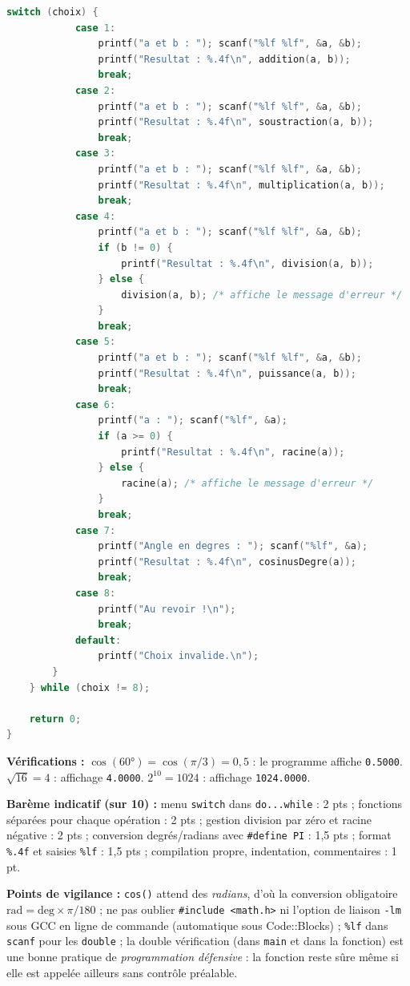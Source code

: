 \documentclass[11pt]{article}
\begin{document}
\begin{corrige}
\begin{lstlisting}[language=C]
        switch (choix) {
            case 1:
                printf("a et b : "); scanf("%lf %lf", &a, &b);
                printf("Resultat : %.4f\n", addition(a, b));
                break;
            case 2:
                printf("a et b : "); scanf("%lf %lf", &a, &b);
                printf("Resultat : %.4f\n", soustraction(a, b));
                break;
            case 3:
                printf("a et b : "); scanf("%lf %lf", &a, &b);
                printf("Resultat : %.4f\n", multiplication(a, b));
                break;
            case 4:
                printf("a et b : "); scanf("%lf %lf", &a, &b);
                if (b != 0) {
                    printf("Resultat : %.4f\n", division(a, b));
                } else {
                    division(a, b); /* affiche le message d'erreur */
                }
                break;
            case 5:
                printf("a et b : "); scanf("%lf %lf", &a, &b);
                printf("Resultat : %.4f\n", puissance(a, b));
                break;
            case 6:
                printf("a : "); scanf("%lf", &a);
                if (a >= 0) {
                    printf("Resultat : %.4f\n", racine(a));
                } else {
                    racine(a); /* affiche le message d'erreur */
                }
                break;
            case 7:
                printf("Angle en degres : "); scanf("%lf", &a);
                printf("Resultat : %.4f\n", cosinusDegre(a));
                break;
            case 8:
                printf("Au revoir !\n");
                break;
            default:
                printf("Choix invalide.\n");
        }
    } while (choix != 8);

    return 0;
}
\end{lstlisting}

\textbf{Vérifications :} $\cos(60°) = \cos(\pi/3) = 0,5$ : le programme affiche \texttt{0.5000}. $\sqrt{16} = 4$ : affichage \texttt{4.0000}. $2^{10} = 1024$ : affichage \texttt{1024.0000}.

\textbf{Barème indicatif (sur 10) :} menu \texttt{switch} dans \texttt{do...while} : 2 pts ; fonctions séparées pour chaque opération : 2 pts ; gestion division par zéro et racine négative : 2 pts ; conversion degrés/radians avec \texttt{\#define PI} : 1,5 pts ; format \texttt{\%.4f} et saisies \texttt{\%lf} : 1,5 pts ; compilation propre, indentation, commentaires : 1 pt.

\textbf{Points de vigilance :} \texttt{cos()} attend des \emph{radians}, d'où la conversion obligatoire $\text{rad} = \text{deg} \times \pi / 180$ ; ne pas oublier \texttt{\#include <math.h>} ni l'option de liaison \texttt{-lm} sous GCC en ligne de commande (automatique sous Code::Blocks) ; \texttt{\%lf} dans \texttt{scanf} pour les \texttt{double} ; la double vérification (dans \texttt{main} et dans la fonction) est une bonne pratique de \emph{programmation défensive} : la fonction reste sûre même si elle est appelée ailleurs sans contrôle préalable.
\end{corrige}
\end{document}

